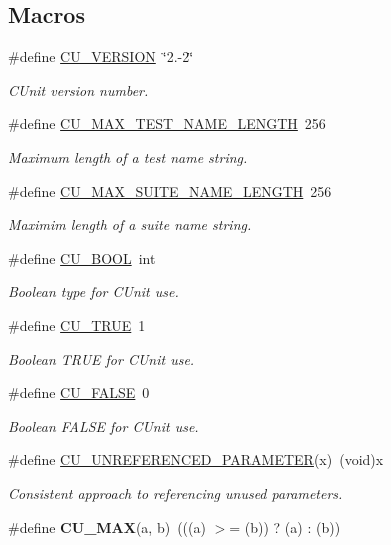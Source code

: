 \subsection*{Macros}
\begin{DoxyCompactItemize}
\item 
\#define \hyperlink{group__Framework_gaac14cadefd27f1bb23db3ab4b104ee54}{C\-U\-\_\-\-V\-E\-R\-S\-I\-O\-N}~\char`\"{}2.-\/2\char`\"{}
\begin{DoxyCompactList}\small\item\em C\-Unit version number. \end{DoxyCompactList}\item 
\#define \hyperlink{group__Framework_ga9a099de9abf9b1b3650734feea06ac5c}{C\-U\-\_\-\-M\-A\-X\-\_\-\-T\-E\-S\-T\-\_\-\-N\-A\-M\-E\-\_\-\-L\-E\-N\-G\-T\-H}~256
\begin{DoxyCompactList}\small\item\em Maximum length of a test name string. \end{DoxyCompactList}\item 
\#define \hyperlink{group__Framework_gae31e7ab4133f02f9631a83414994165f}{C\-U\-\_\-\-M\-A\-X\-\_\-\-S\-U\-I\-T\-E\-\_\-\-N\-A\-M\-E\-\_\-\-L\-E\-N\-G\-T\-H}~256
\begin{DoxyCompactList}\small\item\em Maximim length of a suite name string. \end{DoxyCompactList}\item 
\#define \hyperlink{group__Framework_gabd98d449e979a6379b06551242106dd4}{C\-U\-\_\-\-B\-O\-O\-L}~int
\begin{DoxyCompactList}\small\item\em Boolean type for C\-Unit use. \end{DoxyCompactList}\item 
\#define \hyperlink{group__Framework_ga99641394bc766ca9c4a295e942fed1ef}{C\-U\-\_\-\-T\-R\-U\-E}~1
\begin{DoxyCompactList}\small\item\em Boolean T\-R\-U\-E for C\-Unit use. \end{DoxyCompactList}\item 
\#define \hyperlink{group__Framework_ga7453214541b156ef868681eaafe60860}{C\-U\-\_\-\-F\-A\-L\-S\-E}~0
\begin{DoxyCompactList}\small\item\em Boolean F\-A\-L\-S\-E for C\-Unit use. \end{DoxyCompactList}\item 
\#define \hyperlink{group__Framework_ga4dba71bf5d76673e1b074074208fe081}{C\-U\-\_\-\-U\-N\-R\-E\-F\-E\-R\-E\-N\-C\-E\-D\-\_\-\-P\-A\-R\-A\-M\-E\-T\-E\-R}(x)~(void)x
\begin{DoxyCompactList}\small\item\em Consistent approach to referencing unused parameters. \end{DoxyCompactList}\item 
\hypertarget{group__Framework_gaa30f984e2ed4202d8c6767986d72a668}{\#define {\bfseries C\-U\-\_\-\-M\-A\-X}(a, b)~(((a) $>$= (b)) ? (a) \-: (b))}\label{group__Framework_gaa30f984e2ed4202d8c6767986d72a668}


\end{DoxyCompactItemize}
